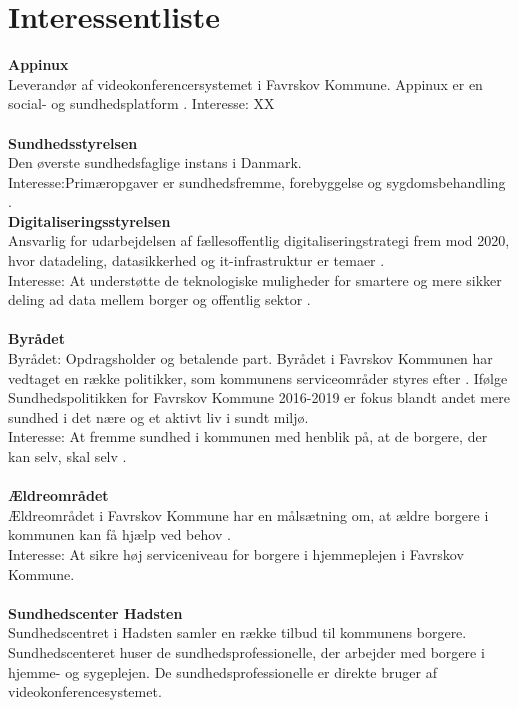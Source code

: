 \section{Interessentliste}
\textbf{Appinux}\\
 Leverandør af videokonferencersystemet i Favrskov Kommune. Appinux er en social- og sundhedsplatform \cite{appinuxwebsite}.
Interesse: XX \\ \\
\textbf{Sundhedsstyrelsen}\\
Den øverste sundhedsfaglige instans i Danmark.\\ Interesse:Primæropgaver er sundhedsfremme, forebyggelse og sygdomsbehandling \cite{sstyr}.\\

\textbf{Digitaliseringsstyrelsen}\\
Ansvarlig for udarbejdelsen af fællesoffentlig digitaliseringstrategi frem mod 2020, hvor datadeling, datasikkerhed og it-infrastruktur er temaer \cite{digst1}.\\
Interesse: At understøtte de teknologiske muligheder for smartere og mere sikker deling ad data mellem borger og offentlig sektor \cite{digst2}.\\ \\
\textbf{Byrådet}\\
Byrådet: Opdragsholder og betalende part. Byrådet i Favrskov Kommunen har vedtaget en række politikker, som kommunens serviceområder styres efter \cite{favrskovkommune}. Ifølge Sundhedspolitikken for Favrskov Kommune 2016-2019 er fokus blandt andet mere sundhed i det nære og et aktivt liv i sundt miljø.\\
Interesse: At fremme sundhed i kommunen med henblik på, at de borgere, der kan selv, skal selv \cite{favrskovkommune2}.\\ \\
\textbf{Ældreområdet}\\
Ældreområdet i Favrskov Kommune har en målsætning om, at ældre borgere i kommunen kan få hjælp ved behov \cite{favrskovkommune3}.\\
Interesse: At sikre høj serviceniveau for borgere i hjemmeplejen i Favrskov Kommune. \\ \\
\textbf{Sundhedscenter Hadsten}\\
Sundhedscentret i Hadsten samler en række tilbud til kommunens borgere. Sundhedscenteret huser de sundhedsprofessionelle, der arbejder med borgere i hjemme- og sygeplejen. De sundhedsprofessionelle er direkte bruger af videokonferencesystemet.\\
